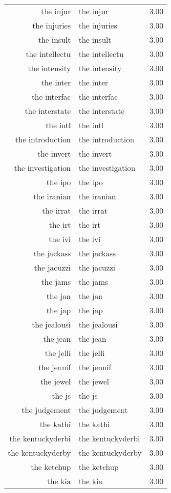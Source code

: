 \begin{table}[ht]
\begin{tabular}{rlr}
  the injur & the injur & 3.00 \\ 
  the injuries & the injuries & 3.00 \\ 
  the insult & the insult & 3.00 \\ 
  the intellectu & the intellectu & 3.00 \\ 
  the intensity & the intensity & 3.00 \\ 
  the inter & the inter & 3.00 \\ 
  the interfac & the interfac & 3.00 \\ 
  the interstate & the interstate & 3.00 \\ 
  the intl & the intl & 3.00 \\ 
  the introduction & the introduction & 3.00 \\ 
  the invert & the invert & 3.00 \\ 
  the investigation & the investigation & 3.00 \\ 
  the ipo & the ipo & 3.00 \\ 
  the iranian & the iranian & 3.00 \\ 
  the irrat & the irrat & 3.00 \\ 
  the irt & the irt & 3.00 \\ 
  the ivi & the ivi & 3.00 \\ 
  the jackass & the jackass & 3.00 \\ 
  the jacuzzi & the jacuzzi & 3.00 \\ 
  the jams & the jams & 3.00 \\ 
  the jan & the jan & 3.00 \\ 
  the jap & the jap & 3.00 \\ 
  the jealousi & the jealousi & 3.00 \\ 
  the jean & the jean & 3.00 \\ 
  the jelli & the jelli & 3.00 \\ 
  the jennif & the jennif & 3.00 \\ 
  the jewel & the jewel & 3.00 \\ 
  the js & the js & 3.00 \\ 
  the judgement & the judgement & 3.00 \\ 
  the kathi & the kathi & 3.00 \\ 
  the kentuckyderbi & the kentuckyderbi & 3.00 \\ 
  the kentuckyderby & the kentuckyderby & 3.00 \\ 
  the ketchup & the ketchup & 3.00 \\ 
  the kia & the kia & 3.00 \\ 

\end{tabular}
\end{table}
